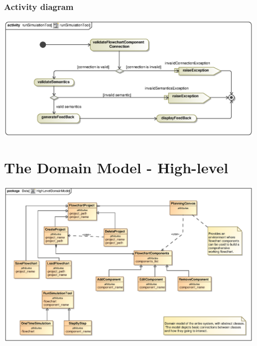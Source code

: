 \documentclass[11pt,a4paper,titlepage]{article}
\begin{document}
\subsubsection{Activity diagram}
\includegraphics[width=500px]{runSimulationToolActivity.eps}

\section{The Domain Model - High-level}
\includegraphics[width=500px]{HighLevelDomainModel.eps}
\end{document}
